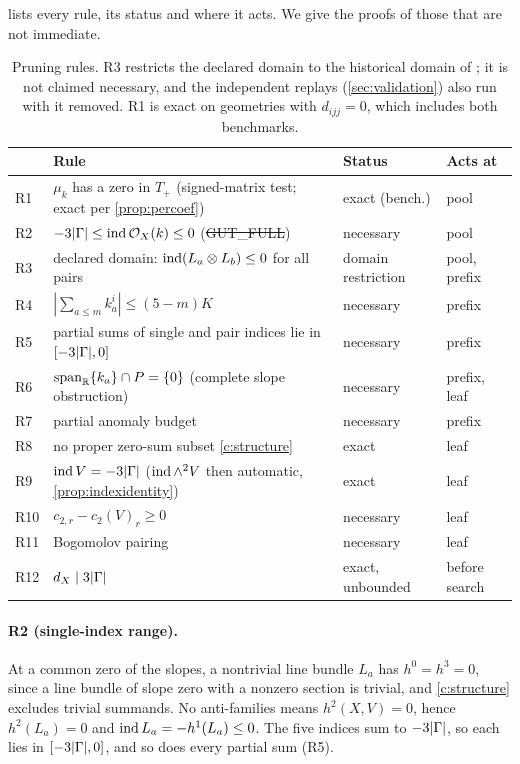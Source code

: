  lists every rule, its status and where it acts. We give the
proofs of those that are not immediate.

\begin{table}[t]
\centering\small
\begin{tabularx}{\textwidth}{@{}lXll@{}}
\toprule
& Rule & Status & Acts at \\
\midrule
R1 & $\mu_k$ has a zero in $T_+$ (signed-matrix test; exact per \cref{prop:percoef}) & exact (bench.) & pool \\
R2 & $-3|\Gamma|\le\operatorname{ind}\mathcal{O}_X(k)\le0$ (\st{GUT\_FULL}) & necessary & pool \\
R3 & declared domain: $\operatorname{ind}(L_a\otimes L_b)\le0$ for all pairs & domain restriction & pool, prefix \\
R4 & $|\sum_{a\le m}k_a^i|\le(5-m)K$ & necessary & prefix \\
R5 & partial sums of single and pair indices lie in $[-3|\Gamma|,0]$ & necessary & prefix \\
R6 & $\operatorname{span}_{\mathbb{R}}\{k_a\}\cap P=\{0\}$ (complete slope obstruction) & necessary & prefix, leaf \\
R7 & partial anomaly budget & necessary & prefix \\
R8 & no proper zero-sum subset \ref{c:structure} & exact & leaf \\
R9 & $\operatorname{ind} V=-3|\Gamma|$ ($\operatorname{ind}\wedge^2V$ then automatic, \cref{prop:indexidentity}) & exact & leaf \\
R10 & $c_{2,r}-c_2(V)_r\ge0$ & necessary & leaf \\
R11 & Bogomolov pairing & necessary & leaf \\
R12 & $d_X\mid 3|\Gamma|$ & exact, unbounded & before search \\
\bottomrule
\end{tabularx}
\caption{Pruning rules. R3 restricts the declared domain to the historical
domain of \cite{ACGLP2013}; it is not claimed necessary, and the independent
replays (\cref{sec:validation}) also run with it removed. R1 is exact on
geometries with $d_{ijj}=0$, which includes both benchmarks.}
\label{tab:rules}
\end{table}

\paragraph{R2 (single-index range).} At a common zero of the slopes, a
nontrivial line bundle $L_a$ has $h^0=h^3=0$, since a line bundle of slope zero
with a nonzero section is trivial, and \ref{c:structure} excludes trivial
summands. No anti-families means $h^2(X,V)=0$, hence $h^2(L_a)=0$ and
$\operatorname{ind} L_a=-h^1(L_a)\le0$. The five indices sum to $-3|\Gamma|$, so each lies in
$[-3|\Gamma|,0]$, and so does every partial sum (R5).

